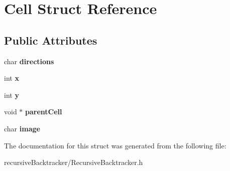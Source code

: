 \hypertarget{struct_cell}{\section{Cell Struct Reference}
\label{struct_cell}
}
\subsection*{Public Attributes}
\begin{DoxyCompactItemize}
\item 
\hypertarget{struct_cell_aa432bd8a7ea643f6aad4e1ebc27e2b2d}{char {\bfseries directions}}\label{struct_cell_aa432bd8a7ea643f6aad4e1ebc27e2b2d}

\item 
\hypertarget{struct_cell_ac008158796a0bfdf37be2f26eff651ef}{int {\bfseries x}}\label{struct_cell_ac008158796a0bfdf37be2f26eff651ef}

\item 
\hypertarget{struct_cell_ab99a0cead05c6b8129ddf3231b11c1ad}{int {\bfseries y}}\label{struct_cell_ab99a0cead05c6b8129ddf3231b11c1ad}

\item 
\hypertarget{struct_cell_ac5ec3ea991a8936c0c086803158e8903}{void $\ast$ {\bfseries parent\-Cell}}\label{struct_cell_ac5ec3ea991a8936c0c086803158e8903}

\item 
\hypertarget{struct_cell_ad7cbb10d42690e0e3d566456899d8204}{char {\bfseries image}}\label{struct_cell_ad7cbb10d42690e0e3d566456899d8204}

\end{DoxyCompactItemize}


The documentation for this struct was generated from the following file\-:\begin{DoxyCompactItemize}
\item 
recursive\-Backtracker/Recursive\-Backtracker.\-h\end{DoxyCompactItemize}
